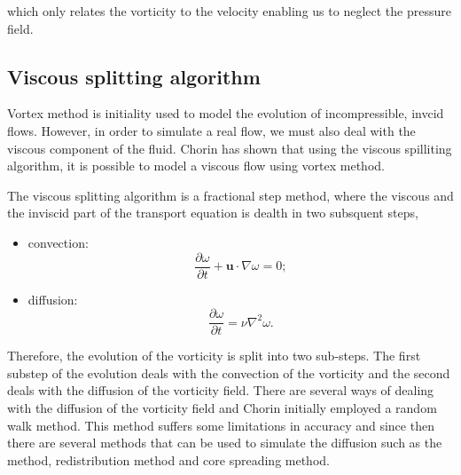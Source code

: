 which only relates the vorticity to the velocity enabling us to neglect the pressure field.


\subsection{Viscous splitting algorithm}
Vortex method is initiality used to model the evolution of incompressible, invcid flows. However, in order to simulate a real flow, we must also deal with the viscous component of the fluid. Chorin \cite{Chorin1973} has shown that using the viscous spilliting algorithm, it is possible to model a viscous flow using vortex method. 

The viscous splitting algorithm is a fractional step method, where the viscous and the inviscid part of the transport equation is dealth in two subsquent steps, 

\begin{itemize}
\item convection:
\begin{equation}
\frac{\partial\omega}{\partial t} + \mathbf{u}\cdot\nabla\omega=0;
\label{eq:convectionEulerian}
\end{equation}
\item diffusion:
\begin{equation}
\frac{\partial\omega}{\partial t} = \nu\nabla^2\omega.
\end{equation}

\end{itemize}

Therefore, the evolution of the vorticity is split into two sub-steps. The first substep of the evolution deals with the convection of the vorticity and the second deals with the diffusion of the vorticity field. There are several ways of dealing with the diffusion of the vorticity field and Chorin initially employed a random walk method. This method suffers some limitations in accuracy and since then there are several methods that can be used to simulate the diffusion such as the  method, redistribution method and core spreading method. 




